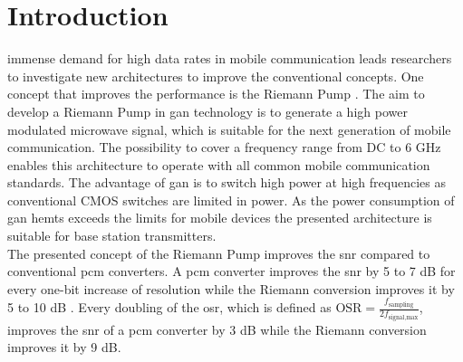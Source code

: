 \documentclass[journal]{IEEEtran}
\begin{document}
\section{Introduction}
\label{sec:introduction}
 immense demand for high data rates in mobile communication leads researchers to investigate new architectures to improve the conventional concepts.
One concept that improves the performance is the Riemann Pump \cite{VeyracRivetDevalEtAl2014}.
The aim to develop a Riemann Pump in \gls{gan} technology is to generate a high power modulated microwave signal, which is suitable for the next generation of mobile communication.
The possibility to cover a frequency range from DC to 6 GHz enables this architecture to operate with all common mobile communication standards.
The advantage of \gls{gan} is to switch high power at high frequencies as conventional CMOS switches are limited in power.
As the power consumption of \gls{gan} \glspl{hemt} exceeds the limits for mobile devices the presented architecture is suitable for base station transmitters.\\
The presented concept of the Riemann Pump improves the \gls{snr} compared to conventional \gls{pcm} converters.
A \gls{pcm} converter improves the \gls{snr} by 5 to 7 dB for every one-bit increase of resolution while the Riemann conversion improves it by 5 to 10 dB \cite{VeyracRivetDevalEtAl2016}.
Every doubling of the \gls{osr}, which is defined as $\text{OSR} = \frac{f_{\text{sampling}}} {2 f_{\text{signal,max}}}$, improves the \gls{snr} of a \gls{pcm} converter by 3 dB while the Riemann conversion improves it by 9 dB.
\end{document}

